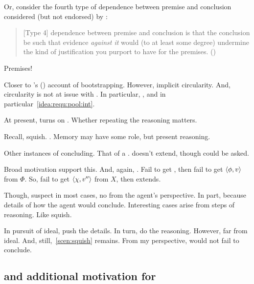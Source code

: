 \begin{note}
{    Or, consider the fourth type of dependence between premise and conclusion considered (but not endorsed) by \textcite{Pryor:2004ws}:

  \begin{quote}
    [Type 4] dependence between premise and conclusion is that the conclusion be such that evidence \emph{against it} would (to at least some degree) undermine the kind of justification you purport to have for the premises.%
    \mbox{}\hfill\mbox{(\citeyear[359]{Pryor:2004ws})}
  \end{quote}
  Premises!

  \nocite{Weisberg:2012vs}
  Closer to \citeauthor{Weisberg:2010to}'s (\citeyear{Weisberg:2010to}) account of bootstrapping.
  However, implicit circularity.
  And, circularity is not at issue with \qzS{}.
  In particular, \requ{}, and in particular~\ref{idea:requ:pool:int}.
  }

  At present, turns on \requ{}.
  Whether repeating the reasoning matters.

  Recall, squish.
  \requ{}.
  Memory may have some role, but present reasoning.
\end{note}

\begin{note}
  Other instances of concluding.
  That of a \requ{}.
  \qzS{} doesn't extend, though \qzS{} could be asked.

  Broad motivation support this.
  And, again, .
  Fail to get \requ{}, then fail to get \(\langle \phi, v \rangle\) from \(\Phi\).
  So, fail to get \(\langle \chi, v'' \rangle\) from \(X\), then extends.

  Though, suspect in most cases, no \requ{} from the agent's perspective.
  In part, because details of how the agent would conclude.
  Interesting cases arise from steps of reasoning.
  Like squish.

  In pursuit of ideal, push the details.
  In turn, do the reasoning.
  However, far from ideal.
  And, still,~\autoref{scen:squish} remains.
  From my perspective, would not fail to conclude.
\end{note}

\subsection{\zSXp{} and additional motivation for \qzS{}}
\label{cha:zS:sec:question:zS}

